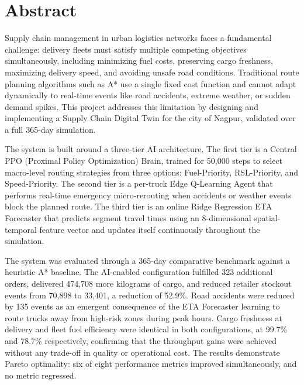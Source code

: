 \chapter*{Abstract}

Supply chain management in urban logistics networks faces a fundamental challenge:
delivery fleets must satisfy multiple competing objectives simultaneously, including
minimizing fuel costs, preserving cargo freshness, maximizing delivery speed, and
avoiding unsafe road conditions. Traditional route planning algorithms such as A*
use a single fixed cost function and cannot adapt dynamically to real-time events
like road accidents, extreme weather, or sudden demand spikes. This project addresses
this limitation by designing and implementing a Supply Chain Digital Twin for the
city of Nagpur, validated over a full 365-day simulation.

The system is built around a three-tier AI architecture. The first tier is a Central
PPO (Proximal Policy Optimization) Brain, trained for 50,000 steps to select
macro-level routing strategies from three options: Fuel-Priority, RSL-Priority, and
Speed-Priority. The second tier is a per-truck Edge Q-Learning Agent that performs
real-time emergency micro-rerouting when accidents or weather events block the
planned route. The third tier is an online Ridge Regression ETA Forecaster that
predicts segment travel times using an 8-dimensional spatial-temporal feature vector
and updates itself continuously throughout the simulation.

The system was evaluated through a 365-day comparative benchmark against a
heuristic A* baseline. The AI-enabled configuration fulfilled 323 additional orders,
delivered 474,708 more kilograms of cargo, and reduced retailer stockout events from
70,898 to 33,401, a reduction of 52.9\%. Road accidents were reduced by 135 events
as an emergent consequence of the ETA Forecaster learning to route trucks away from
high-risk zones during peak hours. Cargo freshness at delivery and fleet fuel
efficiency were identical in both configurations, at 99.7\% and 78.7\% respectively,
confirming that the throughput gains were achieved without any trade-off in quality
or operational cost. The results demonstrate Pareto optimality: six of eight
performance metrics improved simultaneously, and no metric regressed.
